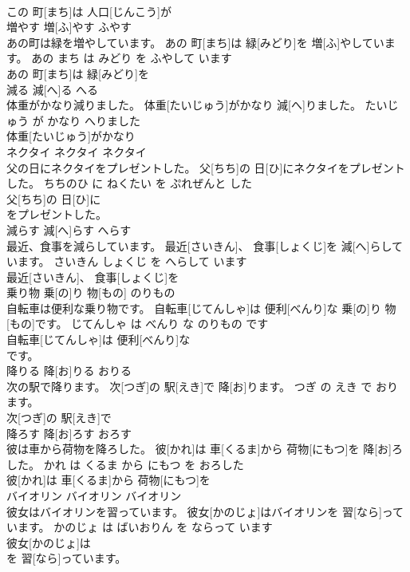 \documentclass[8pt]{extreport}
\begin{document}
\begin{CJK}{UTF8}{min}
\\	この 町[まち]は 人口[じんこう]が
\\	増やす	増[ふ]やす	ふやす	
\\	あの町は緑を増やしています。	あの 町[まち]は 緑[みどり]を 増[ふ]やしています。	あの まち は みどり を ふやして います	
\\	あの 町[まち]は 緑[みどり]を
\\	減る	減[へ]る	へる	
\\	体重がかなり減りました。	体重[たいじゅう]がかなり 減[へ]りました。	たいじゅう が かなり へりました	
\\	体重[たいじゅう]がかなり
\\	ネクタイ	ネクタイ	ネクタイ	
\\	父の日にネクタイをプレゼントした。	父[ちち]の 日[ひ]にネクタイをプレゼントした。	ちちのひ に ねくたい を ぷれぜんと した	
\\	父[ちち]の 日[ひ]に
\\	をプレゼントした。			
\\	減らす	減[へ]らす	へらす	
\\	最近、食事を減らしています。	最近[さいきん]、 食事[しょくじ]を 減[へ]らしています。	さいきん しょくじ を へらして います	
\\	最近[さいきん]、 食事[しょくじ]を
\\	乗り物	乗[の]り 物[もの]	のりもの	
\\	自転車は便利な乗り物です。	自転車[じてんしゃ]は 便利[べんり]な 乗[の]り 物[もの]です。	じてんしゃ は べんり な のりもの です	
\\	自転車[じてんしゃ]は 便利[べんり]な
\\	です。			
\\	降りる	降[お]りる	おりる	
\\	次の駅で降ります。	次[つぎ]の 駅[えき]で 降[お]ります。	つぎ の えき で おります。	
\\	次[つぎ]の 駅[えき]で
\\	降ろす	降[お]ろす	おろす	
\\	彼は車から荷物を降ろした。	彼[かれ]は 車[くるま]から 荷物[にもつ]を 降[お]ろした。	かれ は くるま から にもつ を おろした	
\\	彼[かれ]は 車[くるま]から 荷物[にもつ]を
\\	バイオリン	バイオリン	バイオリン	
\\	彼女はバイオリンを習っています。	彼女[かのじょ]はバイオリンを 習[なら]っています。	かのじょ は ばいおりん を ならって います	
\\	彼女[かのじょ]は
\\	を 習[なら]っています。			

\end{CJK}
\end{document}
